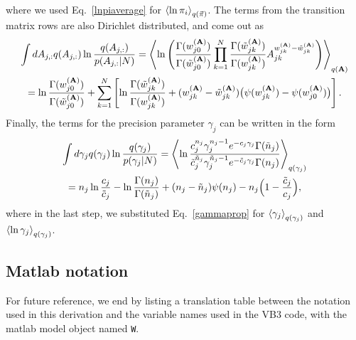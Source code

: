 where we used Eq.~\eqref{lnpiaverage} for
$\left\langle \ln \pi_i\right\rangle_{q(\vec{\pi})}$. The terms from the transition
matrix rows are also Dirichlet distributed, and come out as
\begin{multline}
  \int dA_{j,:} q(A_{j,:}) \ln\frac{q(A_{j,:})}{p(A_{j,:}|N)}
  =\left\langle \ln\left(\frac{\Gamma(w_{j0}^{(\mathbf{A})})}{\Gamma(\tilde w_{j0}^{(\mathbf{A})})}
    \prod_{k=1}^N\frac{\Gamma(\tilde w_{jk}^{(\mathbf{A})})}{\Gamma(w_{jk}^{(\mathbf{A})})}
    A_{jk}^{w_{jk}^{(\mathbf{A})}-\tilde w_{jk}^{(\mathbf{A})}}\right)\right\rangle_{q(\mathbf{A})}\\
  =\ln\frac{\Gamma(w_{j0}^{(\mathbf{A})})}{\Gamma(\tilde w_{j0}^{(\mathbf{A})})}
  +\sum_{k=1}^N\left[\ln\frac{\Gamma(\tilde w_{jk}^{(\mathbf{A})})}{\Gamma(w_{jk}^{(\mathbf{A})})}
    +(w_{jk}^{(\mathbf{A})}-\tilde w_{jk}^{(\mathbf{A})})
    \big(\psi(w_{jk}^{(\mathbf{A})})-\psi(w_{j0}^{(\mathbf{A})})\big)
\right].
\end{multline}
Finally, the terms for the precision parameter $\gamma_j$ can be
written in the form
\begin{multline}
\int d\gamma_j q(\gamma_j)\ln\frac{q(\gamma_j)}{p(\gamma_j|N)}
=\left\langle \ln\frac{c_j^{n_j}\gamma_j^{n_j-1}e^{-c_j\gamma_j}\Gamma(\tilde n_j)}
      {\tilde c_j^{\tilde n_j}\gamma_j^{\tilde n_j-1}e^{-\tilde c_j\gamma_j}\Gamma(n_j)}\right\rangle_{q(\gamma_j)}\\
=n_j\ln\frac{c_j}{\tilde c_j}                    
-\ln\frac{\Gamma(n_j)}{\Gamma(\tilde n_j)}
+(n_j-\tilde n_j)\psi(n_j)
-n_j\Big(1-\frac{\tilde c_j}{c_j}\Big),
\end{multline}
where in the last step, we substituted Eq.~\eqref{gammaprop} for
$\left\langle \gamma_j\right\rangle_{q(\gamma_j)}$ and
$\left\langle \ln\gamma_j\right\rangle_{q(\gamma_j)}$.


\subsection{Matlab notation}
\label{Sec:matlabNotation}
For future reference, we end by listing a translation table between
the notation used in this derivation and the variable names used in
the VB3 code, with the matlab model object named \texttt{W}.

